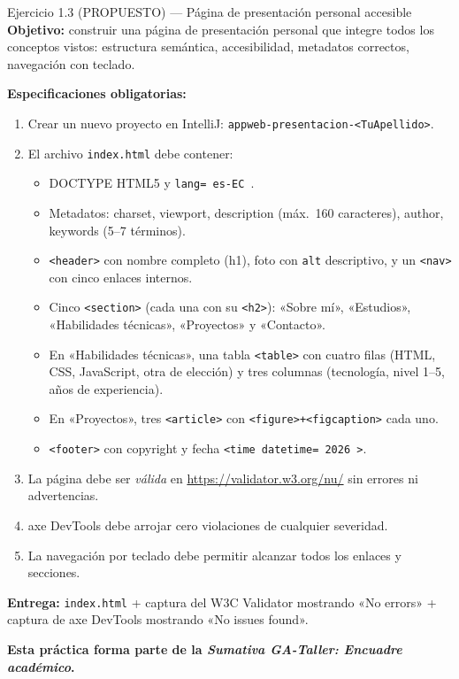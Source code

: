\documentclass[11pt,a4paper,openany]{book}
\begin{document}
\begin{cajaejercicio}{Ejercicio 1.3 (PROPUESTO) --- Página de presentación personal accesible}
\textbf{Objetivo:} construir una página de presentación personal que
integre todos los conceptos vistos: estructura semántica,
accesibilidad, metadatos correctos, navegación con teclado.

\textbf{Especificaciones obligatorias:}
\begin{enumerate}
\item Crear un nuevo proyecto en IntelliJ:
\texttt{appweb-presentacion-<TuApellido>}.
\item El archivo \texttt{index.html} debe contener:
   \begin{itemize}
   \item DOCTYPE HTML5 y \texttt{lang= es-EC }.
   \item Metadatos: charset, viewport, description (máx.\ 160
   caracteres), author, keywords (5--7 términos).
   \item \texttt{<header>} con nombre completo (h1), foto con
   \texttt{alt} descriptivo, y un \texttt{<nav>} con cinco enlaces
   internos.
   \item Cinco \texttt{<section>} (cada una con su \texttt{<h2>}):
   «Sobre mí», «Estudios», «Habilidades técnicas», «Proyectos» y
   «Contacto».
   \item En «Habilidades técnicas», una tabla \texttt{<table>}
   con cuatro filas (HTML, CSS, JavaScript, otra de elección) y
   tres columnas (tecnología, nivel 1--5, años de experiencia).
   \item En «Proyectos», tres \texttt{<article>} con
   \texttt{<figure>+<figcaption>} cada uno.
   \item \texttt{<footer>} con copyright y fecha
   \texttt{<time datetime= 2026 >}.
   \end{itemize}
\item La página debe ser \emph{válida} en
\url{https://validator.w3.org/nu/} sin errores ni advertencias.
\item axe DevTools debe arrojar cero violaciones de cualquier
severidad.
\item La navegación por teclado debe permitir alcanzar todos los
enlaces y secciones.
\end{enumerate}

\textbf{Entrega:} \texttt{index.html} + captura del W3C Validator
mostrando «No errors» + captura de axe DevTools mostrando «No issues
found».

\textbf{Esta práctica forma parte de la \emph{Sumativa GA-Taller:
Encuadre académico}.}
\end{cajaejercicio}
\end{document}

